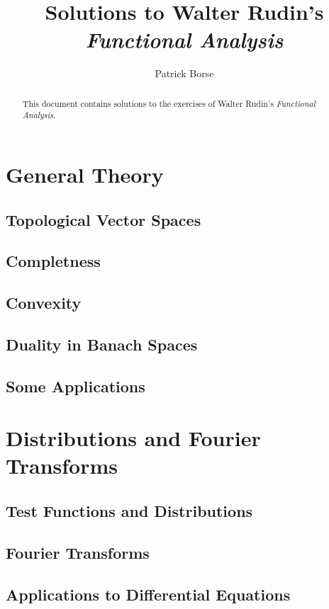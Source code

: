 \documentclass[oneside]{amsbook}
\title{Solutions to Walter Rudin's\\ \emph{Functional Analysis}}
\author{Patrick Borse}
\numberwithin{ex}{chapter}
\begin{document}
\begin{abstract}
This document contains solutions to the exercises of Walter Rudin's \emph{Functional Analysis}. 
\end{abstract}

\maketitle

\tableofcontents

\part{General Theory}
\chapter{Topological Vector Spaces}

\chapter{Completness}

\chapter{Convexity}

\chapter{Duality in Banach Spaces}

\chapter{Some Applications}


\part{Distributions and Fourier Transforms}
\chapter{Test Functions and Distributions}

\chapter{Fourier Transforms}

\chapter{Applications to Differential Equations}

\end{document}
